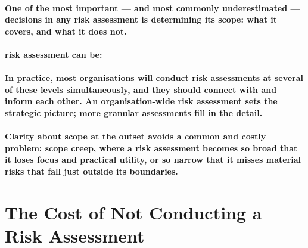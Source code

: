 \paragraph{One of the most important — and most commonly underestimated — decisions in any risk assessment is determining its scope: what it covers, and what it does not.}

\paragraph{ risk assessment can be:}

\begin{itemize}
\end{itemize}

\paragraph{In practice, most organisations will conduct risk assessments at several of these levels simultaneously, and they should connect with and inform each other. An organisation-wide risk assessment sets the strategic picture; more granular assessments fill in the detail.}

\paragraph{Clarity about scope at the outset avoids a common and costly problem: scope creep, where a risk assessment becomes so broad that it loses focus and practical utility, or so narrow that it misses material risks that fall just outside its boundaries.}

\section{The Cost of Not Conducting a Risk Assessment}

